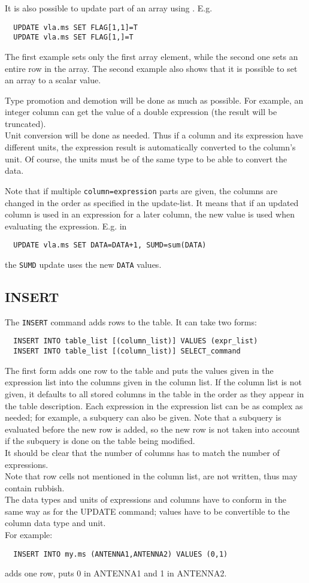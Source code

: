 It is also possible to update part of an array using
. E.g.
\begin{verbatim}
  UPDATE vla.ms SET FLAG[1,1]=T
  UPDATE vla.ms SET FLAG[1,]=T
\end{verbatim}
The first example sets only the first array element, while the second
one sets an entire row in the array. The second example also
shows that it is possible to set an array to a scalar value.

Type promotion and demotion will be done as much as possible.
For example, an integer column can get the value of a double
expression (the result will be truncated).
\\Unit conversion will be done as needed. Thus if a column and
its expression have different units, the expression result is automatically
converted to the column's unit. Of course, the units must be of the
same type to be able to convert the data.

Note that if multiple \texttt{column=expression} parts are given,
the columns are changed in the order as specified in the update-list.
It means that if an updated column is used in an expression for
a later column, the new value is used when evaluating the
expression. E.g. in
\begin{verbatim}
  UPDATE vla.ms SET DATA=DATA+1, SUMD=sum(DATA)
\end{verbatim}
the \texttt{SUMD} update uses the new \texttt{DATA} values.
    

\subsection{INSERT}
The \texttt{INSERT} command adds rows to the table. It can take two forms:
\begin{verbatim}
  INSERT INTO table_list [(column_list)] VALUES (expr_list)
  INSERT INTO table_list [(column_list)] SELECT_command
\end{verbatim}
The first form adds one row to the table and puts the values given in
the expression list into the columns given in the column list.
If the column list is not given, it defaults to all stored columns in
the table in the order as they appear in the table description.
Each expression in the expression list can be as complex as needed;
for example, a subquery can also be given. Note that a subquery is
evaluated before the new row is added, so the new row is not taken
into account if the subquery is done on the table being modified.
\\It should be clear that the number of columns has to match the
number of expressions.
\\Note that row cells not mentioned in the column list,
are not written, thus may contain rubbish.
\\The data types and units of expressions and columns have to conform in
the same way 
as for the UPDATE command; values have to be convertible
to the column data type and unit.
\\For example:
\begin{verbatim}
  INSERT INTO my.ms (ANTENNA1,ANTENNA2) VALUES (0,1)
\end{verbatim}
adds one row, puts 0 in ANTENNA1 and 1 in ANTENNA2.

